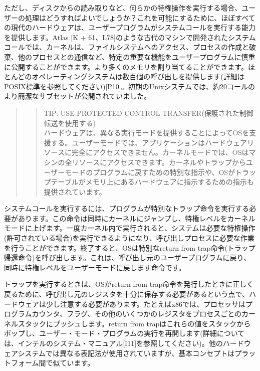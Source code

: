 ただし、ディスクからの読み取りなど、何らかの特権操作を実行する場合、ユーザーの処理はどうすればよいでしょうか？これを可能にするために、ほぼすべての現代のハードウェアは、ユーザープログラムがシステムコールを実行する能力を提供します。Atlas
{[}K +
61、L78{]}のような古代のマシンで開発されたシステムコールでは、カーネルは、ファイルシステムへのアクセス、プロセスの作成と破棄、他のプロセスとの通信など、特定の重要な機能をユーザープログラムに慎重に公開することができます。より多くのメモリを割り当てることができます。ほとんどのオペレーティングシステムは数百個の呼び出しを提供します(詳細はPOSIX標準を参照してください){[}P10{]}。初期のUnixシステムでは、約20コールのより簡潔なサブセットが公開されていました。

\begin{quote}
\begin{quote}
TIP: USE PROTECTED CONTROL TRANSFER(保護された制御転送を使用する)\\
ハードウェアは、異なる実行モードを提供することによってOSを支援する。ユーザーモードでは、アプリケーションはハードウェアリソースに完全にアクセスできません。カーネルモードでは、OSはマシンの全リソースにアクセスできます。カーネルやトラップからユーザーモードのプログラムに戻すための特別な指示や、OSがトラップテーブルがメモリ上にあるハードウェアに指示するための指示も提供されています。
\end{quote}
\end{quote}

システムコールを実行するには、プログラムが特別なトラップ命令を実行する必要があります。この命令は同時にカーネルにジャンプし、特権レベルをカーネルモードに上げます。一度カーネル内で実行されると、システムは必要な特権操作(許可されている場合)を実行できるようになり、呼び出しプロセスに必要な作業を行うことができます。終了すると、OSは特別なreturn
from
trap命令(トラップ帰還命令)を呼び出します。これは、呼び出し元のユーザープログラムに戻り、同時に特権レベルをユーザーモードに戻します命令です。

トラップを実行するときは、OSがreturn from
trap命令を発行したときに正しく戻るために、呼び出し元のレジスタを十分に保存する必要があるという点で、ハードウェアは少し注意する必要があります。たとえばx86では、プロセッサはプログラムカウンタ、フラグ、その他のいくつかのレジスタをプロセスごとのカーネルスタックにプッシュします。return
from
trapはこれらの値をスタックからポップし、ユーザー・モード・プログラムの実行を再開します(詳細については、インテルのシステム・マニュアル{[}I11{]}を参照してください)。他のハードウェアシステムでは異なる表記法が使用されていますが、基本コンセプトはプラットフォーム間で似ています。

